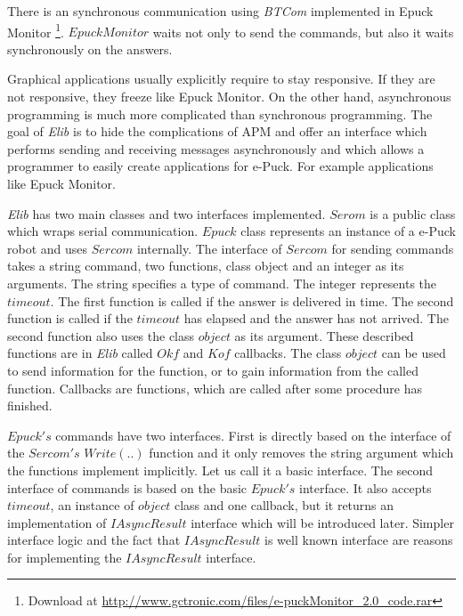  There is an synchronous communication using {\it BTCom} implemented in Epuck Monitor
  \footnote{\small{Download at \url{http://www.gctronic.com/files/e-puckMonitor_2.0_code.rar}}}. 
  $Epuck Monitor$ waits not only to send the commands, but also it waits synchronously on the answers.
   
  Graphical applications usually explicitly require to stay responsive. 
  If they are not responsive, they freeze like Epuck Monitor.
  On the other hand, asynchronous programming is much more complicated than synchronous programming.
  The goal of {\it Elib} is to hide the complications of APM and offer an interface
  which performs sending and receiving messages asynchronously and
  which allows a programmer to easily create applications for e-Puck. For example applications like Epuck Monitor.
   
  {\it Elib} has two main classes and two interfaces implemented.
  $Serom$ is a public class which wraps serial communication.
  $Epuck$ class represents an instance of a e-Puck robot and uses $Sercom$ internally.
  The interface of $Sercom$ for sending commands takes a
  string command, two functions, class object and an integer as its arguments.
  The string specifies a type of command. The integer represents the $timeout$.
  The first function is called if the answer is delivered in time.
  The second function is called if the $timeout$ has elapsed and the answer has not arrived.
  The second function also uses the class $object$ as its argument.  These described
  functions are in {\it Elib} called $Okf$ and $Kof$ callbacks. The class $object$
  can be used to send information for the function, or to gain information from the called function.
  Callbacks are functions, which are called after some procedure has finished.

  $Epuck's$ commands have two interfaces. First is directly based on the interface of 
  the $Sercom's$ $Write(..)$ function and it only removes the string argument which the functions
  implement implicitly.
  Let us call it a basic interface.
  The second interface of commands is based on the basic $Epuck's$ interface. 
  It also accepts $timeout$, an instance of $object$ class and one callback, but it returns 
  an implementation of $IAsyncResult$ interface which will be introduced later.
  Simpler interface logic	and the fact that $IAsyncResult$ is well known interface
  are reasons for implementing the $IAsyncResult$ interface.

